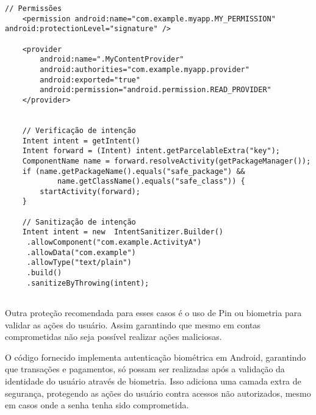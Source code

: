     \begin{scriptsize}
    \estiloJava
    \begin{lstlisting}[caption={Permissões no Android e filtro de intenção}, label=lst:javacode]
    // Permissões
    <permission android:name="com.example.myapp.MY_PERMISSION" android:protectionLevel="signature" />
    
    <provider
        android:name=".MyContentProvider"
        android:authorities="com.example.myapp.provider"
        android:exported="true"
        android:permission="android.permission.READ_PROVIDER"
    </provider>


    // Verificação de intenção
    Intent intent = getIntent()
    Intent forward = (Intent) intent.getParcelableExtra("key");
    ComponentName name = forward.resolveActivity(getPackageManager());
    if (name.getPackageName().equals("safe_package") &&
            name.getClassName().equals("safe_class")) {
        startActivity(forward);
    }

    // Sanitização de intenção
    Intent intent = new  IntentSanitizer.Builder()
     .allowComponent("com.example.ActivityA")
     .allowData("com.example")
     .allowType("text/plain")
     .build()
     .sanitizeByThrowing(intent);
        
    \end{lstlisting}
    \end{scriptsize}

    Outra proteção recomendada para esses casos é o uso de Pin ou biometria para validar as ações do usuário. Assim garantindo que mesmo em contas comprometidas não seja possível realizar ações maliciosas.

    O código fornecido implementa autenticação biométrica em Android, garantindo que transações e pagamentos, só possam ser realizadas após a validação da identidade do usuário através de biometria. Isso adiciona uma camada extra de segurança, protegendo as ações do usuário contra acessos não autorizados, mesmo em casos onde a senha tenha sido comprometida.
    \\

